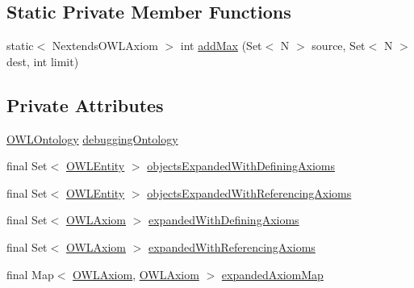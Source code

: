 \subsection*{Static Private Member Functions}
\begin{DoxyCompactItemize}
\item 
static$<$ Nextends\-O\-W\-L\-Axiom $>$ int \hyperlink{classcom_1_1clarkparsia_1_1owlapi_1_1explanation_1_1_black_box_explanation_a93385f8b8525ce084fb82a2ebe604ae0}{add\-Max} (Set$<$ N $>$ source, Set$<$ N $>$ dest, int limit)
\end{DoxyCompactItemize}
\subsection*{Private Attributes}
\begin{DoxyCompactItemize}
\item 
\hyperlink{interfaceorg_1_1semanticweb_1_1owlapi_1_1model_1_1_o_w_l_ontology}{O\-W\-L\-Ontology} \hyperlink{classcom_1_1clarkparsia_1_1owlapi_1_1explanation_1_1_black_box_explanation_aac9915acf277476bbfd124f8af210b09}{debugging\-Ontology}
\item 
final Set$<$ \hyperlink{interfaceorg_1_1semanticweb_1_1owlapi_1_1model_1_1_o_w_l_entity}{O\-W\-L\-Entity} $>$ \hyperlink{classcom_1_1clarkparsia_1_1owlapi_1_1explanation_1_1_black_box_explanation_ae7dabea969f08b96db75ed775b153892}{objects\-Expanded\-With\-Defining\-Axioms}
\item 
final Set$<$ \hyperlink{interfaceorg_1_1semanticweb_1_1owlapi_1_1model_1_1_o_w_l_entity}{O\-W\-L\-Entity} $>$ \hyperlink{classcom_1_1clarkparsia_1_1owlapi_1_1explanation_1_1_black_box_explanation_a9f9ee5d2fe2041cd37b08ccd2d7b4d89}{objects\-Expanded\-With\-Referencing\-Axioms}
\item 
final Set$<$ \hyperlink{interfaceorg_1_1semanticweb_1_1owlapi_1_1model_1_1_o_w_l_axiom}{O\-W\-L\-Axiom} $>$ \hyperlink{classcom_1_1clarkparsia_1_1owlapi_1_1explanation_1_1_black_box_explanation_ac78d1716d81554c1ab65042e5fb287e1}{expanded\-With\-Defining\-Axioms}
\item 
final Set$<$ \hyperlink{interfaceorg_1_1semanticweb_1_1owlapi_1_1model_1_1_o_w_l_axiom}{O\-W\-L\-Axiom} $>$ \hyperlink{classcom_1_1clarkparsia_1_1owlapi_1_1explanation_1_1_black_box_explanation_a80fe17a380adee286d10f75cb77a96d2}{expanded\-With\-Referencing\-Axioms}
\item 
final Map$<$ \hyperlink{interfaceorg_1_1semanticweb_1_1owlapi_1_1model_1_1_o_w_l_axiom}{O\-W\-L\-Axiom}, \hyperlink{interfaceorg_1_1semanticweb_1_1owlapi_1_1model_1_1_o_w_l_axiom}{O\-W\-L\-Axiom} $>$ \hyperlink{classcom_1_1clarkparsia_1_1owlapi_1_1explanation_1_1_black_box_explanation_a9c2cc25974bfb019fe02e606951cacb6}{expanded\-Axiom\-Map}

\end{DoxyCompactItemize}

